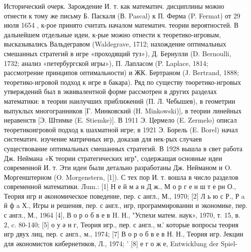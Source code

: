 \documentclass[10pt]{article}
\begin{document}
Исторический очерк. Зарождение И. т. как математич. дисциплины можно отнести к тому же письму Б. Паскаля (В. Pascal) к П. Ферма (P. Fermat) от 29 июля 1654 , к-рое принято считать началом математич. теории вероятностей. В дальнейшем отдельные идеи, к-рые можно отнести к теоретико-игровым, высказывались Вальдегравом (Waldegrave, 1712; нахождение оптимальных смешанных стратегий в игре «проходящий туз»), Д. Бернулли (D. Bernoulli, 1732; анализ «петербургской игры»), П. Лапласом (P. Laplace, 1814; рассмотрение принципов оптимальности) и ЖК. Бертраном (J. Bertrand, 1888; теоретико-игровой подход к игре в бакара). Ряд по существу төоретико-игровых утверждений был в эквивалентной форме рассмотрен в других разделах математики: в теории наилучших приближений (П. Л. Чебышев), в геометрии выпуклых многогранников [Г. Минковский (H. Minkowski)], в теории линейных неравенств [Э. Штимке (E. Stiemke)]. В 1911 Э. Цермело (E. Zermelo) описал теоретикоигровой подход к шахматной игре; в 1921 Э. Борель (E. Borel) начал систематич. изучение матричных игр, доказав для нек-рых случаев существование оптимальных смешанных стратегий. В 1928 вышла в свет работа Дж. Неймана «К теории стратегических игр", содержащая основные идеи современной И. т. Эти идеи были детально разработаны Дж. Нейманом и O. Моргенштерном (O. Morgenstern, [1]). С тех пор И. т. вошла в число разделов современной математики. Лum.: [1] Н е й м а н Д ж., М о р г е н ш т е рн О., Теория игр и әкономическое поведение, пер. с англ., М., 1970; [2] Л ь ю с Р., Р a й ф a Х., Игры и решения, пер. с англ., игр, программировании и экономике, пер. с англ., М., 1964 [4], В о р о б в е в H. Н., "Успехи матем. наук», 1970, т. 15, в. 2, c. 80-140; [5] о у ә н г, Теория игр., пер. с англ., м.' которые вопросы теория игр двух лиц, пер. с англ., м., 1974; [7] В о р о б в е в Н. Н., Теория игр. Јекции для әкономистов кибернетиков, Л., 1974; ' [8] е г о ж е, Entwicklung der Spiel-
\end{document}
